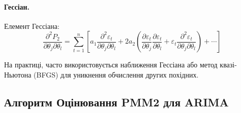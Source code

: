 \documentclass[12pt,a4paper]{article}
\begin{document}
\paragraph{Гессіан.}

Елемент Гессіана:
\begin{equation}
\label{eq:hessian_jl}
\frac{\partial^2 P_2}{\partial \theta_j \partial \theta_l} = \sum_{t=1}^{n} \left[ a_1 \frac{\partial^2 \varepsilon_t}{\partial \theta_j \partial \theta_l} + 2 a_2 \left( \frac{\partial \varepsilon_t}{\partial \theta_j} \frac{\partial \varepsilon_t}{\partial \theta_l} + \varepsilon_t \frac{\partial^2 \varepsilon_t}{\partial \theta_j \partial \theta_l} \right) + \cdots \right]
\end{equation}

На практиці, часто використовується наближення Гессіана або метод квазі-Ньютона (BFGS) для уникнення обчислення других похідних.

\subsection{Алгоритм Оцінювання PMM2 для ARIMA}
\label{subsec:algorithm}
\end{document}
